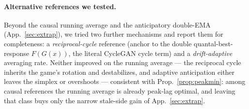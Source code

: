 \documentclass[10pt,twocolumn]{article}
\theoremstyle{plain}
\theoremstyle{remark}
\begin{document}
\paragraph{Alternative references we tested.} Beyond the causal running average and
the anticipatory double-EMA (App.~\ref{sec:extrap}), we tried two further mechanisms
and report them for completeness: a \emph{reciprocal-cycle} reference (anchor to the
double quantal-best-response $F(G(x))$, the literal CycleGAN cycle term) and a
\emph{drift-adaptive} averaging rate. Neither improved on the running average ---
the reciprocal cycle inherits the game's rotation and destabilizes, and adaptive
anticipation either leaves the simplex or overshoots --- consistent with
Prop.~\ref{prop:peakmin}: among causal references the running average is already
peak-lag optimal, and leaving that class buys only the narrow stale-side gain of
App.~\ref{sec:extrap}.
\end{document}
